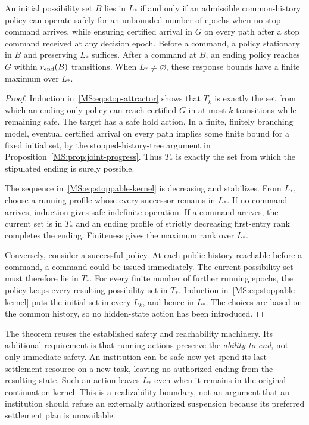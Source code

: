 \begin{MStheorem}\label{MS:thm:stoppable-operation}
An initial possibility set $B$ lies in $L_*$ if and only if an admissible common-history policy can operate safely for an unbounded number of epochs when no stop command arrives, while ensuring certified arrival in $G$ on every path after a stop command received at any decision epoch. Before a command, a policy stationary in $B$ and preserving $L_*$ suffices. After a command at $B$, an ending policy reaches $G$ within $r_{\rm end}(B)$ transitions. When $L_*\ne\varnothing$, these response bounds have a finite maximum over $L_*$.
\end{MStheorem}
\begin{proof}
Induction in~\eqref{MS:eq:stop-attractor} shows that $T_k$ is exactly the set from which an ending-only policy can reach certified $G$ in at most $k$ transitions while remaining safe. The target has a safe hold action. In a finite, finitely branching model, eventual certified arrival on every path implies some finite bound for a fixed initial set, by the stopped-history-tree argument in Proposition~\ref{MS:prop:joint-progress}. Thus $T_*$ is exactly the set from which the stipulated ending is surely possible.

The sequence in~\eqref{MS:eq:stoppable-kernel} is decreasing and stabilizes. From $L_*$, choose a running profile whose every successor remains in $L_*$. If no command arrives, induction gives safe indefinite operation. If a command arrives, the current set is in $T_*$ and an ending profile of strictly decreasing first-entry rank completes the ending. Finiteness gives the maximum rank over $L_*$.

Conversely, consider a successful policy. At each public history reachable before a command, a command could be issued immediately. The current possibility set must therefore lie in $T_*$. For every finite number of further running epochs, the policy keeps every resulting possibility set in $T_*$. Induction in~\eqref{MS:eq:stoppable-kernel} puts the initial set in every $L_k$, and hence in $L_*$. The choices are based on the common history, so no hidden-state action has been introduced.
\end{proof}

The theorem reuses the established safety and reachability machinery. Its additional requirement is that running actions preserve the \emph{ability to end}, not only immediate safety. An institution can be safe now yet spend its last settlement resource on a new task, leaving no authorized ending from the resulting state. Such an action leaves $L_*$ even when it remains in the original continuation kernel. This is a realizability boundary, not an argument that an institution should refuse an externally authorized suspension because its preferred settlement plan is unavailable.

